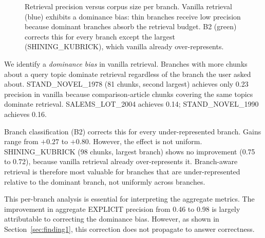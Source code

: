 \documentclass[conference]{IEEEtran}
\begin{document}
\begin{figure}[t]
\centering
{}
\caption{Retrieval precision versus corpus size per branch. Vanilla retrieval (blue) exhibits a dominance bias: thin branches receive low precision because dominant branches absorb the retrieval budget. B2 (green) corrects this for every branch except the largest (SHINING\_KUBRICK), which vanilla already over-represents.}
\label{fig:perbranch}
\end{figure}

We identify a \emph{dominance bias} in vanilla retrieval. Branches with more chunks about a query topic dominate retrieval regardless of the branch the user asked about. STAND\_NOVEL\_1978 (81 chunks, second largest) achieves only 0.23 precision in vanilla because comparison-article chunks covering the same topics dominate retrieval. SALEMS\_LOT\_2004 achieves 0.14; STAND\_NOVEL\_1990 achieves 0.16.

Branch classification (B2) corrects this for every under-represented branch. Gains range from $+0.27$ to $+0.80$. However, the effect is not uniform. SHINING\_KUBRICK (98 chunks, largest branch) shows no improvement (0.75 to 0.72), because vanilla retrieval already over-represents it. Branch-aware retrieval is therefore most valuable for branches that are under-represented relative to the dominant branch, not uniformly across branches.

This per-branch analysis is essential for interpreting the aggregate metrics. The improvement in aggregate EXPLICIT precision from 0.46 to 0.98 is largely attributable to correcting the dominance bias. However, as shown in Section~\ref{sec:finding1}, this correction does not propagate to answer correctness.
\end{document}
